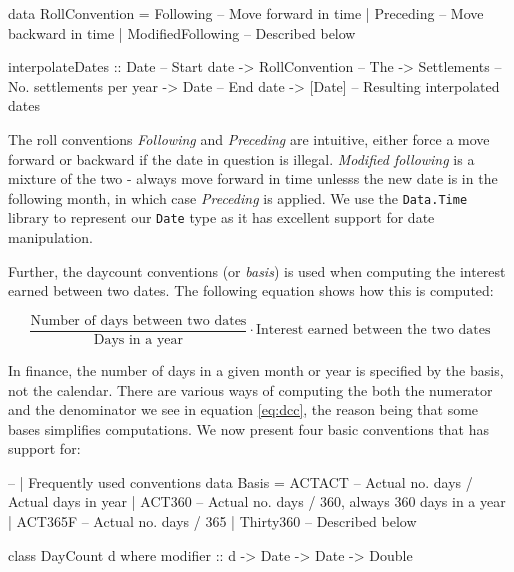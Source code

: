\begin{hscode}
data RollConvention = Following -- Move forward in time 
                    | Preceding -- Move backward in time
                    | ModifiedFollowing -- Described below

interpolateDates :: Date           -- Start date
                 -> RollConvention -- The 
                 -> Settlements    -- No. settlements per year
                 -> Date           -- End date
                 -> [Date]         -- Resulting interpolated dates
\end{hscode}

The roll conventions \emph{Following} and \emph{Preceding} are intuitive, either
force a move forward or backward if the date in question is illegal. 
\emph{Modified following} is a mixture of the two - always move forward in time
unlesss the new date is in the following month, in which case \emph{Preceding}
is applied.
We use the \texttt{Data.Time} library to represent our \texttt{Date} type
as it has excellent support for date manipulation.\\


Further, the daycount conventions (or \emph{basis}) is used when computing the
interest earned between two dates. The following equation shows how this is
computed:

\begin{equation}\label{eq:dcc}
\frac{\text{Number of days between two dates}}{\text{Days in a year}} \cdot \text{Interest earned between the two dates}
\end{equation}

In finance, the number of days in a given month or year is specified by the
basis, not the calendar. There are various ways of computing the both the numerator
and the denominator we see in equation \ref{eq:dcc}, the reason being that some
bases simplifies computations. We now present four basic conventions that \hql
has support for:

\begin{hscode}
-- | Frequently used conventions 
data Basis = ACTACT -- Actual no. days / Actual days in year
           | ACT360 -- Actual no. days / 360, always 360 days in a year
           | ACT365F -- Actual no. days / 365
           | Thirty360 -- Described below

class DayCount d where
  modifier :: d -> Date -> Date -> Double
\end{hscode}


